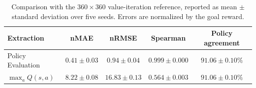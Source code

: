 \begin{table}[H]
    \centering
    \small
    \begin{tabular}{lcccc}
        \hline
        \textbf{Extraction} & \textbf{nMAE} & \textbf{nRMSE} & \textbf{Spearman} & \textbf{Policy agreement} \\
        \hline
        Policy Evaluation & $0.41\pm0.03$ & $0.94\pm0.04$ & $0.999\pm0.000$ & $91.06\pm0.10\%$ \\
        $\max_a Q(s,a)$ & $8.22\pm0.08$ & $16.83\pm0.13$ & $0.564\pm0.003$ & $91.06\pm0.10\%$ \\
        \hline
    \end{tabular}
    \caption{Comparison with the $360\times360$ value-iteration reference, reported as mean $\pm$ standard deviation over five seeds. Errors are normalized by the goal reward.}
    \label{tab:rq3-value-function-quality}
\end{table}
